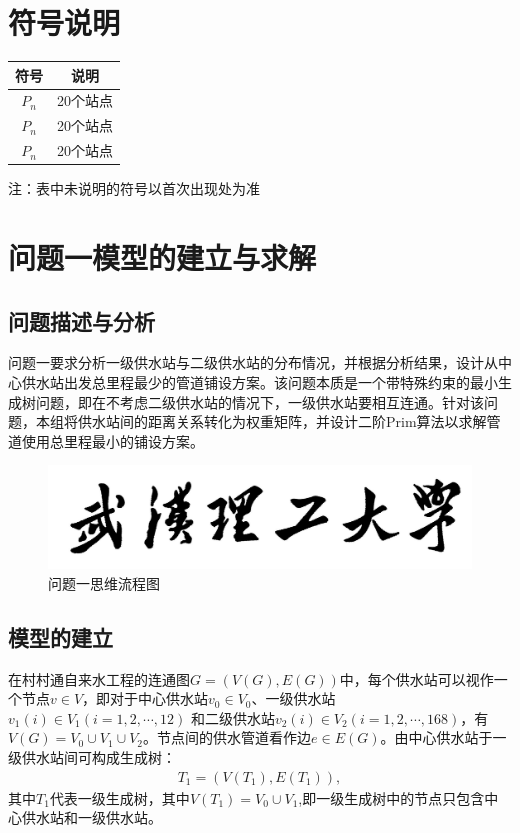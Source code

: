 \documentclass{whutmod}
\begin{document}
		
	\section{符号说明}
		\begin{table}[H]
		\centering
		\setlength{\tabcolsep}{12mm}
		\begin{tabular}{cc}
			\toprule[1.5pt]
			\multicolumn{1}{m{5cm}}{\centering 符号} & \multicolumn{1}{m{5cm}}{\centering 说明} \\
			\midrule[1pt]		
			$P_n$  & 20个站点  \\ 
			$P_n$  & 20个站点  \\ 
		   	$P_n$  & 20个站点  \\ 
			\bottomrule[1.5pt]
		\end{tabular}
		\begin{tablenotes}
		\item 注：表中未说明的符号以首次出现处为准
		\end{tablenotes}
		\end{table}

	\section{问题一模型的建立与求解}
		\subsection{问题描述与分析}
			问题一要求分析一级供水站与二级供水站的分布情况，并根据分析结果，设计从中心供水站出发总里程最少的管道铺设方案。该问题本质是一个带特殊约束的最小生成树问题，即在不考虑二级供水站的情况下，一级供水站要相互连通。针对该问题，本组将供水站间的距离关系转化为权重矩阵，并设计二阶Prim算法以求解管道使用总里程最小的铺设方案。
			
		
			\begin{figure}[H]
				\centering
				\includegraphics[width=\textwidth]{figures/whut.jpg}
				\caption{问题一思维流程图}\label{lct}
			\end{figure}
			
		\subsection{模型的建立}
		在村村通自来水工程的连通图$G=(V(G),E(G))$中，每个供水站可以视作一个节点$v \in V$，即对于中心供水站$v_0 \in V_0$、一级供水站$v_1(i) \in V_1 (i=1,2,\cdots,12)$ 和二级供水站$v_2(i) \in V_2 (i=1,2,\cdots,168)$，有$V(G)=V_0\cup  V_1\cup V_2$。节点间的供水管道看作边$e \in E(G)$。由中心供水站于一级供水站间可构成生成树：
		\begin{gather*}
		T_{1}=(V(T_{1}),E(T_{1})),
		\end{gather*}
		其中$T_{1}$代表一级生成树，其中$V(T_{1})=V_0\cup V_1$,即一级生成树中的节点只包含中心供水站和一级供水站。
		
\end{document}
